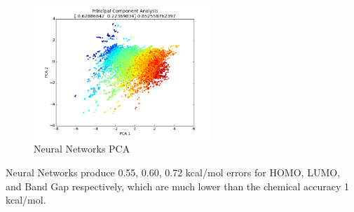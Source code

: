 \begin{figure}[H]
\begin{center}
\includegraphics [width=0.6\textwidth]{07_conn.png}
\caption{Neural Networks PCA}\label{nnpca}
\end{center}
\end{figure}

Neural Networks produce 0.55, 0.60, 0.72 kcal/mol errors for HOMO, LUMO, and Band Gap respectively, which are much lower than the chemical accuracy 1 kcal/mol. 
